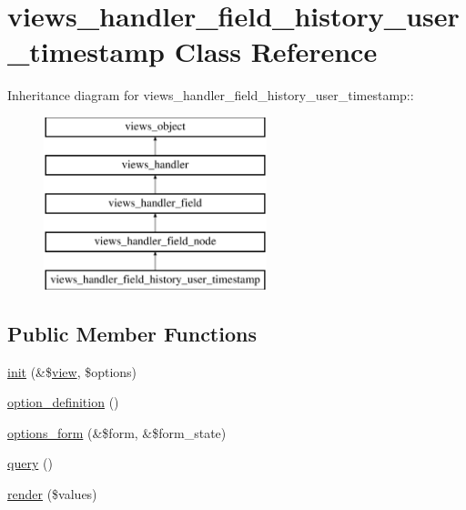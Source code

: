 \hypertarget{classviews__handler__field__history__user__timestamp}{
\section{views\_\-handler\_\-field\_\-history\_\-user\_\-timestamp Class Reference}
\label{classviews__handler__field__history__user__timestamp}
}
Inheritance diagram for views\_\-handler\_\-field\_\-history\_\-user\_\-timestamp::\begin{figure}[H]
\begin{center}
\leavevmode
\includegraphics[height=5cm]{classviews__handler__field__history__user__timestamp}
\end{center}
\end{figure}
\subsection*{Public Member Functions}
\begin{CompactItemize}
\item 
\hyperlink{classviews__handler__field__history__user__timestamp_0cc37c49613f0f55e4fc35733c35b806}{init} (\&\$\hyperlink{classview}{view}, \$options)
\item 
\hyperlink{classviews__handler__field__history__user__timestamp_2cedbce8f02c9c051606c89e6d349e6b}{option\_\-definition} ()
\item 
\hyperlink{classviews__handler__field__history__user__timestamp_785f6784b015c681b25f58573b1e6859}{options\_\-form} (\&\$form, \&\$form\_\-state)
\item 
\hyperlink{classviews__handler__field__history__user__timestamp_bd6ff7a6d51f75781cf6ea6288612c07}{query} ()
\item 
\hyperlink{classviews__handler__field__history__user__timestamp_cc2398dad2662ab9d4faf0ea9daba116}{render} (\$values)
\end{CompactItemize}



